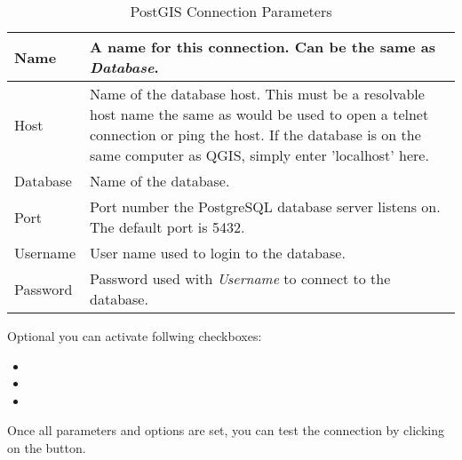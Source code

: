 \begin{table}[ht]
\centering
\caption{PostGIS Connection
Parameters}\label{tab:postgis_connection_parms}\medskip
 \begin{tabular}{|l|p{5in}|}
\hline Name & A name for this connection. Can be the same as \textsl{Database}.
\\
\hline Host \index{PostgreSQL!host}
& Name of the database host. This must be a resolvable host name the same as
would be used to open a telnet connection or ping the host. If the database is 
on the same computer as QGIS, simply enter 'localhost' here. \\
\hline Database \index{PostgreSQL!database} & Name of the database.  \\
\hline Port \index{PostgreSQL!port}& Port number the PostgreSQL database
server listens on. The default port is 5432.\\
\hline Username \index{PostgreSQL!username}& User name used to login to the
database. \\
\hline Password \index{PostgreSQL!password}& Password used with
\textsl{Username} to connect to the database.\\
\hline
\end{tabular}
\end{table}

Optional you can activate follwing checkboxes:

\begin{itemize}
\item {}
\item {}
\item {}
\end{itemize}

Once all parameters and options are set, you can test the connection by
clicking on the  button.

\begin{Tip}\caption{\textsc{QGIS User Settings and
Security}}
\end{Tip}

